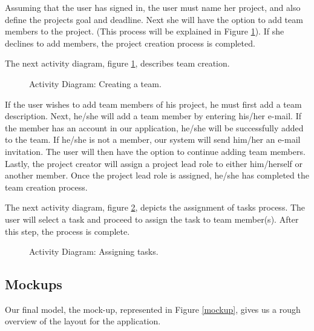 \par Assuming that the user has signed in, the user must name her project, and also define the project\textsc{}s goal and deadline. Next she will have the option to add team members to the project. (This process will be explained in Figure \ref{activityTwo}).  If she declines to add members, the project creation process is completed. 

\par The next activity diagram, figure \ref{activityTwo}, describes team creation.

\FloatBarrier 
\begin{figure}[ht]
\centering
{}
\caption{Activity Diagram: Creating a team.}
\label{activityTwo}
\end{figure}
\FloatBarrier 

\par If the user wishes to add team members of his project, he must first add a team description. Next, he/she will add a team member by entering his/her e-mail. If the member has an account in our application, he/she will be successfully added to the team. If he/she is not a member, our system will send him/her an e-mail invitation. The user will then have the option to continue adding team members. Lastly, the project creator will assign a project lead role to either him/herself or another member. Once the project lead role is assigned, he/she has completed the team creation process. 

\par The next activity diagram, figure \ref{activityFour}, depicts the assignment of  tasks process. The user will select a task and proceed to assign the task to team member(s). After this step, the process is complete. 

\begin{figure}[ht]
\centering
{}
\caption{Activity Diagram: Assigning tasks.}
\label{activityFour}
\end{figure}
\FloatBarrier


\subsection{Mockups}

Our final model, the mock-up, represented in Figure \ref{mockup}, gives us a rough overview of the layout for the application. 

